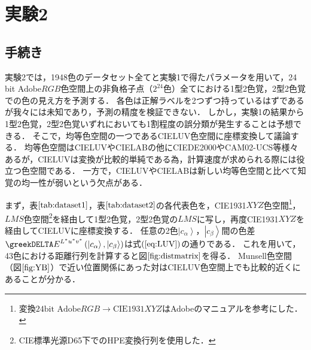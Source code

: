 \documentclass[uplatex,paper=a4,fontsize=4.0truemm,jafontsize=4.0truemm,head_space=30.0truemm,foot_space=30.0truemm,baselineskip=8.0truemm,line_length=40zw,gutter=25.0truemm,oneside,openany,fleqn,hanging_panctuation,open_bracket_pos=nibu_tentsuki,dvipdfmx,jis2004,book,titlepage]{jlreq}
\theoremstyle{mystyle}
\newcommand{\mathdisplaystyle}[1]{\(\displaystyle{#1}\)}
\newcommand{\Reference}[1]{\mathdisplaystyle{\ref{#1}}}
\newcommand{\Equationreference}[1]{\mathdisplaystyle{\parentheses{\ref{#1}}}}
\newcommand{\parentheses}[1]{\left(#1\right)}
\newcommand{\Diracket}[1]{\left\lvert#1\right\rangle}
\begin{document}
		\section{実験2}
			\subsection{手続き}
				実験2では，1948色のデータセット全てと実験1で得たパラメータを用いて，24 bit Adobe\mathdisplaystyle{RGB}色空間上の非負格子点（\mathdisplaystyle{2^{24}}色）全てにおける1型2色覚，2型2色覚での色の見え方を予測する．
				各色は正解ラベルを2つずつ持っているはずであるが我々には未知であり，予測の精度を検証できない．
				しかし，実験1の結果から1型2色覚，2型2色覚いずれにおいても1割程度の誤分類が発生することは予想できる．
				そこで，均等色空間の一つであるCIELUV色空間に座標変換して議論する．
				均等色空間はCIELUVやCIELABの他にCIEDE2000やCAM02-UCS等様々ある\cite{Yaguchi2017b}が，CIELUVは変換が比較的単純である為，計算速度が求められる際には役立つ色空間である．
				一方で，CIELUVやCIELABは新しい均等色空間と比べて知覚の均一性が弱いという欠点がある\cite[p.~10]{Robertson1977}．

				まず，表\Reference{tab:dataset1}，表\Reference{tab:dataset2}の各代表色を，CIE1931\mathdisplaystyle{XYZ}色空間\footnote{変換\mathdisplaystyle{\textrm{24bit Adobe}RGB\to\textrm{CIE1931}XYZ}はAdobe\textregistered のマニュアル\cite{Adobe2005}を参考にした．}，\mathdisplaystyle{LMS}色空間\footnote{CIE標準光源D65下でのHPE変換行列を使用した．}を経由して1型2色覚，2型2色覚の\mathdisplaystyle{LMS}に写し，再度CIE1931\mathdisplaystyle{XYZ}を経由してCIELUVに座標変換する．
				任意の2色\mathdisplaystyle{\Diracket{c_\alpha}}，\mathdisplaystyle{\Diracket{c_\beta}}間の色差\mathdisplaystyle{\greekDELTA E^{L^\ast u^\ast v^\ast}\parentheses{\Diracket{c_\alpha},\Diracket{c_\beta}}}は式\Equationreference{eq:LUV}の通りである．
				これを用いて，43色における距離行列を計算すると図\Reference{fig:distmatrix}を得る．
				Munsell色空間（図\Reference{fig:YB}）で近い位置関係にあった対はCIELUV色空間上でも比較的近くにあることが分かる．
\end{document}
